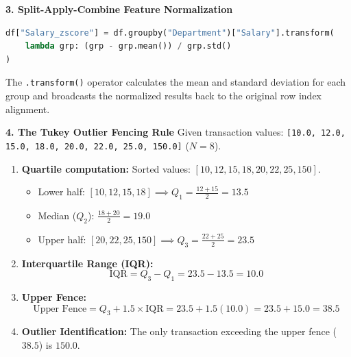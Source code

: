 \textbf{3. Split-Apply-Combine Feature Normalization}
\begin{lstlisting}[language=Python]
df["Salary_zscore"] = df.groupby("Department")["Salary"].transform(
    lambda grp: (grp - grp.mean()) / grp.std()
)
\end{lstlisting}
The \texttt{.transform()} operator calculates the mean and standard deviation for each group and broadcasts the normalized results back to the original row index alignment.

\textbf{4. The Tukey Outlier Fencing Rule}
Given transaction values: \texttt{[10.0, 12.0, 15.0, 18.0, 20.0, 22.0, 25.0, 150.0]} ($N = 8$).
\begin{enumerate}
    \item \textbf{Quartile computation:}
    Sorted values: $[10, 12, 15, 18, 20, 22, 25, 150]$.
    \begin{itemize}
        \item Lower half: $[10, 12, 15, 18] \implies Q_1 = \frac{12 + 15}{2} = \mathbf{13.5}$
        \item Median ($Q_2$): $\frac{18 + 20}{2} = \mathbf{19.0}$
        \item Upper half: $[20, 22, 25, 150] \implies Q_3 = \frac{22 + 25}{2} = \mathbf{23.5}$
    \end{itemize}
    \item \textbf{Interquartile Range (IQR):}
    \begin{equation*}
    \text{IQR} = Q_3 - Q_1 = 23.5 - 13.5 = \mathbf{10.0}
    \end{equation*}
    \item \textbf{Upper Fence:}
    \begin{equation*}
    \text{Upper Fence} = Q_3 + 1.5 \times \text{IQR} = 23.5 + 1.5(10.0) = 23.5 + 15.0 = \mathbf{38.5}
    \end{equation*}
    \item \textbf{Outlier Identification:}
    The only transaction exceeding the upper fence ($38.5$) is $\mathbf{150.0}$.
\end{enumerate}

